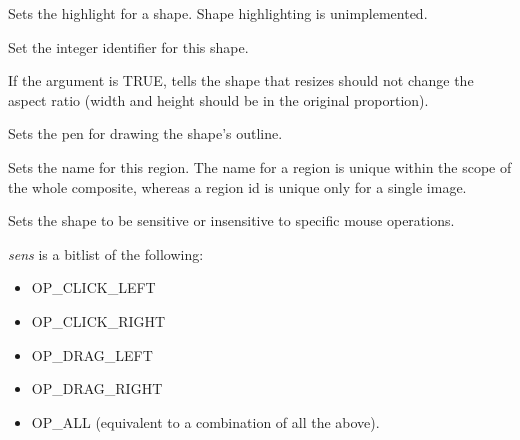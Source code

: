 
Sets the highlight for a shape. Shape highlighting is unimplemented.



Set the integer identifier for this shape.

\label{wxshapesetmaintainaspectratio}


If the argument is TRUE, tells the shape that resizes should not change the aspect ratio
(width and height should be in the original proportion).



Sets the pen for drawing the shape's outline.

\label{wxshapesetregionname}


Sets the name for this region. The name for a region is unique within the scope of the whole
composite, whereas a region id is unique only for a single image.

\label{wxshapesetsensitivityfilter}


Sets the shape to be sensitive or insensitive to specific mouse operations.

{\it sens} is a bitlist of the following:

\begin{itemize}\itemsep=0pt
\item OP\_CLICK\_LEFT
\item OP\_CLICK\_RIGHT
\item OP\_DRAG\_LEFT
\item OP\_DRAG\_RIGHT
\item OP\_ALL (equivalent to a combination of all the above).
\end{itemize}

\label{wxshapesetshadowmode}


